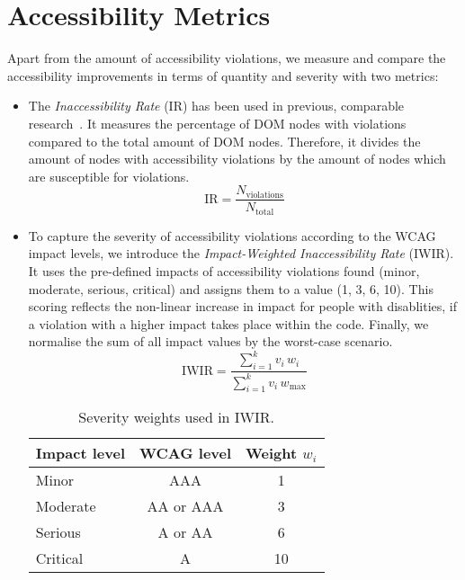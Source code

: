 \section{Accessibility Metrics}
Apart from the amount of accessibility violations, we measure and compare the 
accessibility improvements in terms of 
quantity and severity with two metrics:
\begin{itemize}
  \item The \textit{Inaccessibility Rate} (IR) has been used in previous, comparable
research~\parencite{alshayban2020accessibility}. It measures the 
percentage of DOM nodes with violations compared to the total amount of DOM nodes.
Therefore, it divides the amount of nodes with accessibility 
violations by the amount of nodes which are susceptible for violations.\newline
\begin{equation}
    \mathrm{IR} = \frac{N_{\mathrm{violations}}}{N_{\mathrm{total}}}
\end{equation}
\item To capture the severity of accessibility violations according to the WCAG impact levels,
we introduce the \textit{Impact-Weighted Inaccessibility Rate} (IWIR). It 
uses the pre-defined impacts of accessibility violations found 
(minor, moderate, serious, critical)
and assigns them to a value (1, 3, 6, 10). This scoring reflects the non-linear 
increase in impact for people with disablities, if a violation with a higher 
impact takes place within the code. Finally, we normalise the sum of all 
impact values by the worst-case scenario.\newline
\begin{equation}
  \mathrm{IWIR} = 
    \frac{\displaystyle\sum_{i=1}^{k} v_i \, w_i}
         {\displaystyle\sum_{i=1}^{k} v_i \, w_{\mathrm{max}}}
  \label{eq:iwir}
\end{equation}
\begin{table}[ht]
\centering

\caption{Severity weights used in IWIR.}
  \label{tab:weights}
  \begin{tabular}{lcc}
  \toprule
  Impact level & WCAG level & Weight $w_i$ \\
  \midrule
  Minor    & AAA          & 1  \\
  Moderate & AA or AAA    & 3  \\
  Serious  & A or AA      & 6  \\
  Critical & A          & 10 \\
  \bottomrule
  \end{tabular}
\end{table}

\end{itemize}

